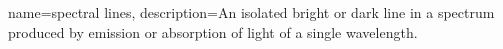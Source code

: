 {
    name=spectral lines,
    description={An isolated bright or dark line in a spectrum produced by emission or absorption of light of a single wavelength.}
}
